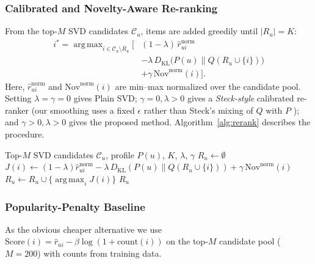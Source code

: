 \documentclass[conference]{IEEEtran}
\DeclareMathOperator*{\argmax}{arg\,max}
\newcommand{\KL}{D_{\mathrm{KL}}}
\begin{document}
  \subsubsection{Calibrated and Novelty-Aware Re-ranking}\label{sec:obj}
  From the top-$M$ SVD candidates $\mathcal{C}_u$, items are added greedily until $|R_u|=K$:
  \begin{equation}
  \label{eq:obj}
  \begin{aligned}
  i^*=\argmax_{i\in\mathcal{C}_u\setminus R_u} \Big[
    &(1-\lambda)\,\widehat{r}^{\text{norm}}_{ui}\\
    &-\lambda\,\KL\bigl(P(u)\parallel Q(R_u\cup\{i\})\bigr)\\
    &+\gamma\,\mathrm{Nov}^{\text{norm}}(i)\Big].
  \end{aligned}
  \end{equation}
  Here, $\widehat{r}^{\text{norm}}_{ui}$ and $\mathrm{Nov}^{\text{norm}}(i)$ are min--max normalized over the candidate pool. Setting $\lambda=\gamma=0$ gives Plain SVD; $\gamma=0,\lambda>0$ gives a \emph{Steck-style} calibrated re-ranker (our smoothing uses a fixed $\epsilon$ rather than Steck's mixing of $Q$ with $P$ \cite{steck2018}); and $\gamma>0,\lambda>0$ gives the proposed method. Algorithm~\ref{alg:rerank} describes the procedure.

  \begin{algorithm}[t]
  \caption{Calibrated and Novelty-Aware Greedy Re-ranking}
  \label{alg:rerank}
  \begin{algorithmic}[1]
  \Require Top-$M$ SVD candidates $\mathcal{C}_u$, profile $P(u)$, $K$, $\lambda$, $\gamma$
  \State $R_u\gets\emptyset$
      \State $J(i)\gets(1-\lambda)\widehat{r}^{\text{norm}}_{ui}-\lambda\,\KL(P(u)\parallel Q(R_u\cup\{i\}))+\gamma\,\mathrm{Nov}^{\text{norm}}(i)$
    \EndFor
    \State $R_u\gets R_u\cup\{\argmax_i J(i)\}$
  \EndWhile
  \State \Return $R_u$
  \end{algorithmic}
  \end{algorithm}

  \subsubsection{Popularity-Penalty Baseline}
  As the obvious cheaper alternative we use $\mathrm{Score}(i)=\widehat{r}_{ui}-\beta\log(1+\mathrm{count}(i))$ on the top-$M$ candidate pool ($M=200$) with counts from training data.
\end{document}
